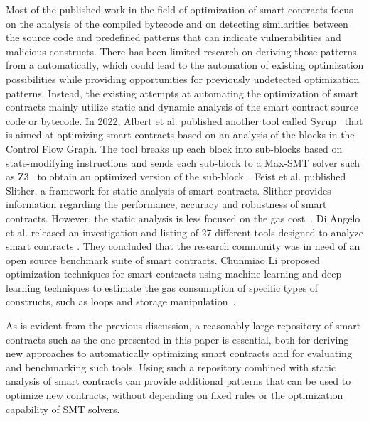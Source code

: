 \documentclass[10pt,conference]{IEEEtran}
\begin{document}
	Most of the published work in the field of optimization of smart contracts focus on the analysis of the compiled bytecode and on detecting similarities between the source code and predefined patterns that can indicate vulnerabilities and malicious constructs. There has been limited research on deriving those patterns from a automatically, which could lead to the automation of existing optimization possibilities while providing opportunities for previously undetected optimization patterns.  Instead, the existing attempts at automating the optimization of smart contracts mainly utilize static and dynamic analysis of the smart contract source code or bytecode. In 2022, Albert et al. published another tool called Syrup~\cite{superoptimization} that is aimed at optimizing smart contracts based on an analysis of the blocks in the Control Flow Graph. The tool breaks up each block into sub-blocks based on state-modifying instructions and sends each sub-block to a Max-SMT solver such as Z3~\cite{z3solver} to obtain an optimized version of the sub-block~\cite{superoptimization}. Feist et al. published Slither, a framework for static analysis of smart contracts. Slither provides information regarding the performance, accuracy and robustness of smart contracts. However, the static analysis is less focused on the gas cost~\cite{slither}. Di Angelo et al. released an investigation and listing of 27 different tools designed to analyze smart contracts \cite{diangelo}. They concluded that the research community was in need of an open source benchmark suite of smart contracts. Chunmiao Li proposed optimization techniques for smart contracts using machine learning and deep learning techniques to estimate the gas consumption of specific types of constructs, such as loops and storage manipulation~\cite{chunmiaoli}. 
	
	As is evident from the previous discussion, a reasonably large repository of smart contracts such as the one presented in this paper is essential, both for deriving new approaches to automatically optimizing smart contracts and for evaluating and benchmarking such tools. Using such a repository combined with static analysis of smart contracts can provide additional patterns that can be used to optimize new contracts, without depending on fixed rules or the optimization capability of SMT solvers.
	
\end{document}
